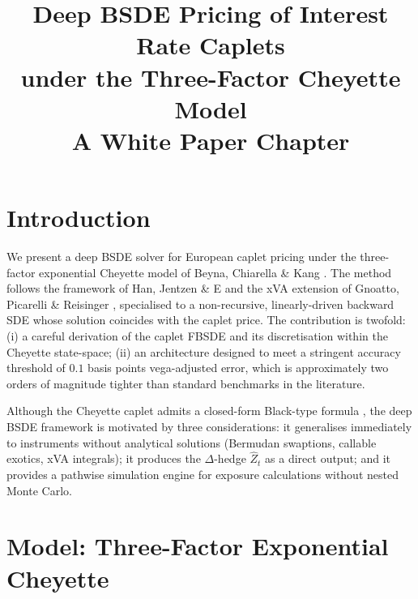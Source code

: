 \documentclass[11pt,a4paper]{article}
\title{\textbf{Deep BSDE Pricing of Interest Rate Caplets\\
under the Three-Factor Cheyette Model}\\[0.5em]
\large A White Paper Chapter}
\author{}
\date{}
\begin{document}
\maketitle
\tableofcontents
\bigskip

\section{Introduction}

We present a deep BSDE solver for European caplet pricing under the
three-factor exponential Cheyette model of Beyna, Chiarella \& Kang
\cite{BCK2012}. The method follows the framework of Han, Jentzen \& E
\cite{HJE2018} and the xVA extension of Gnoatto, Picarelli \& Reisinger
\cite{GPR2022}, specialised to a non-recursive, linearly-driven backward
SDE whose solution coincides with the caplet price. The contribution is
twofold: (i) a careful derivation of the caplet FBSDE and its discretisation
within the Cheyette state-space; (ii) an architecture designed to meet a
stringent accuracy threshold of $0.1$ basis points vega-adjusted error, which
is approximately two orders of magnitude tighter than standard benchmarks in
the literature.

Although the Cheyette caplet admits a closed-form Black-type formula
\cite{BCK2012}, the deep BSDE framework is motivated by three considerations:
it generalises immediately to instruments without analytical solutions
(Bermudan swaptions, callable exotics, xVA integrals); it produces the
$\Delta$-hedge $\widehat{Z}_t$ as a direct output; and it provides a
pathwise simulation engine for exposure calculations without nested Monte
Carlo.

\section{Model: Three-Factor Exponential Cheyette}
\label{sec:model}
\end{document}

